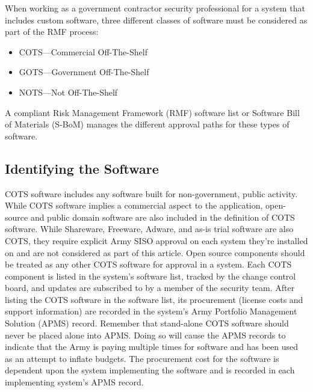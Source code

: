 When working as a government contractor security professional for a system that includes custom software, three different classes of software must be considered as part of the RMF process:
\begin{itemize}
	\item COTS---Commercial Off-The-Shelf
	\item GOTS---Government Off-The-Shelf
	\item NOTS---Not Off-The-Shelf
\end{itemize}

A compliant Risk Management Framework (RMF) software list or Software Bill of Materials (S-BoM) manages the different approval paths for these types of software.

\subsection{Identifying the Software}

COTS software includes any software built for non-government, public activity. While COTS software implies a commercial aspect to the application, open-source and public domain software are also included in the definition of COTS software. While Shareware, Freeware, Adware, and as-is trial software are also COTS, they require explicit Army SISO approval on each system they're installed on and are not considered as part of this article.\autocite[4–12.a.6]{20210405-ar25-2} Open source components should be treated as any other COTS software for approval in a system. Each COTS component is listed in the system’s software list, tracked by the change control board, and updates are subscribed to by a member of the security team. After listing the COTS software in the software list, its procurement (license costs and support information) are recorded in the system’s Army Portfolio Management Solution (APMS) record. Remember that stand-alone COTS software should never be placed alone into APMS. Doing so will cause the APMS records to indicate that the Army is paying multiple times for software and has been used as an attempt to inflate budgets. The procurement cost for the software is dependent upon the system implementing the software and is recorded in each implementing system's APMS record.

